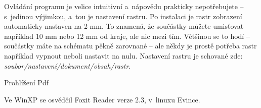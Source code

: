 Ovládání programu je velice intuitivní a~nápovědu prakticky nepotřebujete -- s~jedinou výjimkou, a~tou je nastavení rastru. Po instalaci je rastr zobrazení automaticky nastaven na 2 mm. To znamená, že součástky můžete umisťovat například 10 mm nebo 12 mm od kraje, ale nic mezi tím. Většinou se to hodí -- součástky máte na schématu pěkně zarovnané -- ale někdy je prostě potřeba rastr například vypnout neboli nastavit na nulu. Nastavení rastru je schované zde:  {\it soubor/nastavení/dokument/obsah/rastr}.

\secc Prohlížení Pdf

Ve WinXP se osvědčil Foxit Reader verze 2.3, v~linuxu Evince.  

